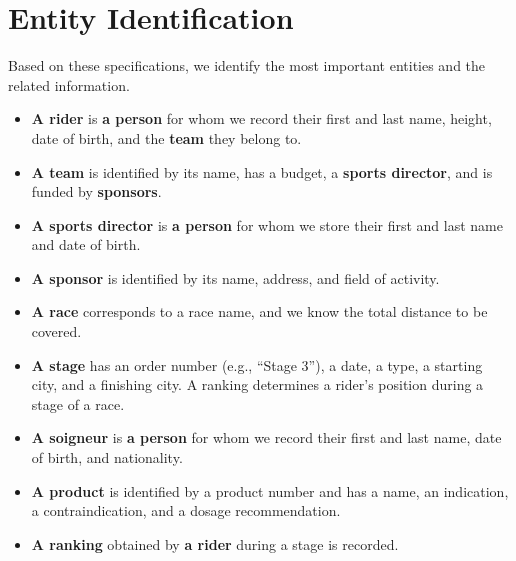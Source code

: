 \section{Entity Identification}

Based on these specifications, we identify the most important entities and the related information.

\begin{itemize}
\item \textbf{A rider} is \textbf{a person} for whom we record their first and last name, height, date of birth, and the \textbf{team} they belong to.
\item \textbf{A team} is identified by its name, has a budget, a \textbf{sports director}, and is funded by \textbf{sponsors}.
\item \textbf{A sports director} is \textbf{a person} for whom we store their first and last name and date of birth.
\item \textbf{A sponsor} is identified by its name, address, and field of activity.
\item \textbf{A race} corresponds to a race name, and we know the total distance to be covered.
\item \textbf{A stage} has an order number (e.g., “Stage 3”), a date, a type, a starting city, and a finishing city.
A ranking determines a rider’s position during a stage of a race.
\item \textbf{A soigneur} is \textbf{a person} for whom we record their first and last name, date of birth, and nationality.
\item \textbf{A product} is identified by a product number and has a name, an indication, a contraindication, and a dosage recommendation.
\item \textbf{A ranking} obtained by \textbf{a rider} during a stage is recorded.
\end{itemize}
